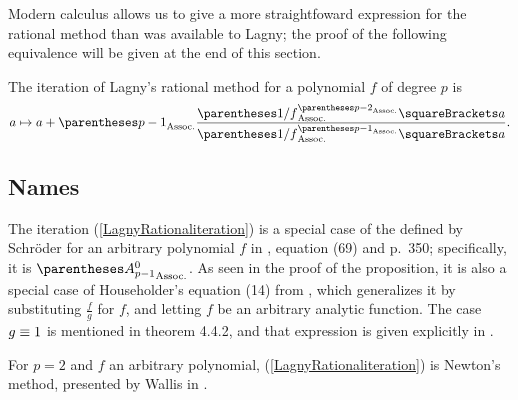 ﻿\documentclass[10pt, a4paper, twoside]{basestyle}
\begin{document}
Modern calculus allows us to give a more straightfoward expression for the rational method than was available to Lagny;
the proof of the following equivalence will be given at the end of this section.

\begin{proposition}
The iteration of Lagny’s rational method for a polynomial $f$ of degree $p$ is\begin{equation}
a\mapsto a + \pa{p-1}\frac{\pa{1/f}^{\pa{p-2}}\of{a}}{\pa{1/f}^{\pa{p-1}}\of{a}}\text.\label{LagnyRationaliteration}
\end{equation}
\end{proposition}

\subsection*{Names}
The iteration (\ref{LagnyRationaliteration}) is a special case of the  defined by Schröder for an
arbitrary polynomial $f$ in \cite{Schröder1870}, equation (69) and p.~350; specifically, it is $\pa{A^0_{p-1}}$.
As seen in the proof of the proposition, it is also a special case of Householder’s  equation (14) from \cite[169]{Householder1970},
which generalizes it by substituting $\frac{f}{g}$ for $f$, and letting $f$ be an arbitrary analytic function. The case
$g\equiv1$ is mentioned in theorem 4.4.2, and that expression is given explicitly in \cite{SebahGourdon2001}.

For $p=2$ and $f$ an arbitrary polynomial, (\ref{LagnyRationaliteration}) is Newton's method, presented by Wallis in
\cite[338]{Wallis1685}.
\end{document}
